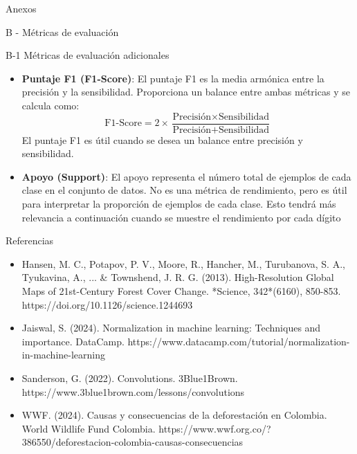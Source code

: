 \documentclass[11pt]{article}
\begin{document}
\begin{section}{Anexos}
\begin{subsection}{B - Métricas de evaluación}
\begin{subsubsection}{B-1 Métricas de evaluación adicionales}
\begin{itemize}
    \item \textbf{Puntaje F1 (F1-Score)}: El puntaje F1 es la media armónica entre la precisión y la sensibilidad. Proporciona un balance entre ambas métricas y se calcula como:
    \[
    \text{F1-Score} = 2 \times \frac{\text{Precisión} \times \text{Sensibilidad}}{\text{Precisión} + \text{Sensibilidad}}
    \]
    El puntaje F1 es útil cuando se desea un balance entre precisión y sensibilidad.
    
    \item \textbf{Apoyo (Support)}: El apoyo representa el número total de ejemplos de cada clase en el conjunto de datos. No es una métrica de rendimiento, pero es útil para interpretar la proporción de ejemplos de cada clase. Esto tendrá más relevancia a continuación cuando se muestre el rendimiento por cada dígito
\end{itemize}

\end{subsubsection}

    
\end{subsection}

    
\end{section}

\begin{section}{Referencias}

\begin{itemize}

\item Hansen, M. C., Potapov, P. V., Moore, R., Hancher, M., Turubanova, S. A., Tyukavina, A., ... & Townshend, J. R. G. (2013). High-Resolution Global Maps of 21st-Century Forest Cover Change. *Science, 342*(6160), 850-853. https://doi.org/10.1126/science.1244693

\item Jaiswal, S. (2024). Normalization in machine learning: Techniques and importance. DataCamp. https://www.datacamp.com/tutorial/normalization-in-machine-learning

\item Sanderson, G. (2022). Convolutions. 3Blue1Brown. https://www.3blue1brown.com/lessons/convolutions

\item WWF. (2024). Causas y consecuencias de la deforestación en Colombia. World Wildlife Fund Colombia. https://www.wwf.org.co/?386550/deforestacion-colombia-causas-consecuencias

\end{itemize}

\end{section}
\end{document}
